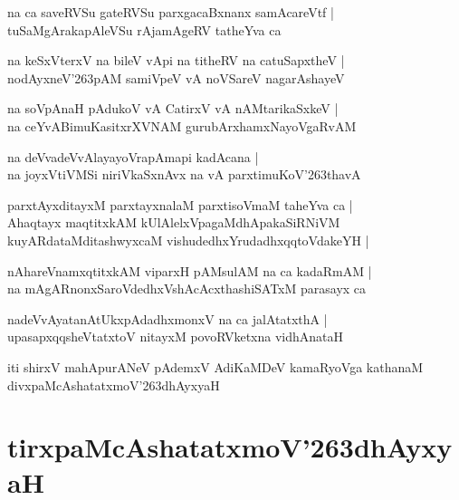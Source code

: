 \documentclass[twoside,12pt,openright]{book}
\def\S{\char'263}
\newcounter{shloka}[chapter]
\begin{document}
\begin{shloka}
na ca saveRVSu gateRVSu parxgacaBxnanx samAcareVtf |\\
tuSaMgArakapAleVSu rAjamAgeRV tatheYva ca 
\end{shloka}

\begin{shloka}
na keSxVterxV na bileV vApi na titheRV na catuSapxtheV |\\
nodAyxneV\S pAM samiVpeV vA noVSareV nagarAshayeV 
\end{shloka}

\begin{shloka}
na soVpAnaH pAdukoV vA CatirxV vA nAMtarikaSxkeV |\\
na ceYvABimuKasitxrXVNAM gurubArxhamxNayoVgaRvAM 
\end{shloka}

\begin{shloka}
na deVvadeVvAlayayoVrapAmapi kadAcana |\\
na joyxVtiVMSi niriVkaSxnAvx na vA parxtimuKoV\S thavA 
\end{shloka}

\begin{shloka}
parxtAyxditayxM parxtayxnalaM parxtisoVmaM taheYva ca |\\
Ahaqtayx maqtitxkAM kUlAlelxVpagaMdhApakaSiRNiVM \\
kuyARdataMditashwyxcaM vishudedhxYrudadhxqqtoVdakeYH |
\end{shloka}

\begin{shloka}
nAhareVnamxqtitxkAM viparxH pAMsulAM na ca kadaRmAM |\\
na mAgARnonxSaroVdedhxVshAcAcxthashiSATxM  parasayx ca 
\end{shloka}

\begin{shloka}
nadeVvAyatanAtUkxpAdadhxmonxV na ca jalAtatxthA |\\
upasapxqqsheVtatxtoV nitayxM povoRVketxna vidhAnataH 
\end{shloka}

\begin{center}
iti shirxV mahApurANeV pAdemxV AdiKaMDeV kamaRyoVga kathanaM divxpaMcAshatatxmoV\S dhAyxyaH
\end{center}

\chapter{tirxpaMcAshatatxmoV\S dhAyxyaH}
\end{document}
